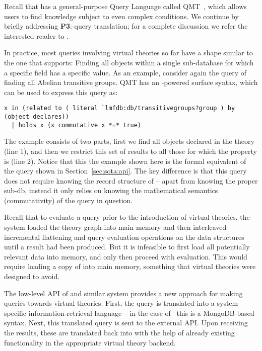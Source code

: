 Recall that \mmt has a general-purpose Query Language called QMT~\cite{Rabe:qlfml12}, which allows users to find knowledge subject to even complex conditions. 
We continue by briefly addressing \textbf{P3}: query translation; for a complete discussion we refer the interested reader to \cite{twiesing:msc17}. 

In practice, most queries involving virtual theories so far have a shape similar to the one that \lmfdb supports: 
Finding all objects within a single sub-database for which a specific field has a specific value. 
As an example, consider again the query of finding all Abelian transitive groups. 
QMT has an \mmt-powered surface syntax, which can be used to express this query as:
\begin{lstlisting}[language=qmt,basicstyle=\small\sf]
x in (related to ( literal `lmfdb:db/transitivegroups?group ) by (object declares)) 
  | holds x (x commutative x *=* true)
\end{lstlisting}

The example consists of two parts, first we find all objects declared in the  theory (line 1), and then we restrict this set of results to all those for which the  property is  (line 2). 
Notice that this the example shown here is the formal equivalent of the \lmfdb query shown in Section~\ref{sec:sota:api}. 
The key difference is that this query does not require knowing the record structure of \lmfdb --
apart from knowing the proper sub-db, instead it only relies on knowing the mathematical
semantics (commutativity) of the query in question. 

Recall that to evaluate a query prior to the introduction of virtual theories, the \mmt system loaded the theory graph into main memory and then interleaved incremental flattening and query evaluation operations on the \mmt data structures until a result had been produced. 
But it is infeasible to first load all potentially relevant data into memory, and only then proceed with evaluation. 
This would require loading a copy of \lmfdb into main memory, something that virtual theories were designed to avoid. 

The low-level API of  \lmfdb and similar system provides a new approach for making queries towards virtual theories. 
First, the \mmt query is translated into a system-specific information-retrieval language -- in the case of \lmfdb\ this is a MongoDB-based syntax.
Next, this translated query is sent to the external API. 
Upon receiving the results, these are translated back into \ommt with the help of already existing functionality in the appropriate virtual theory backend.

